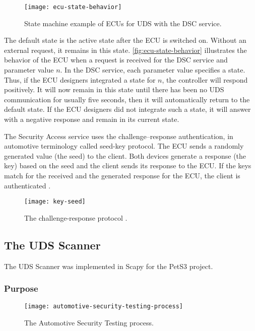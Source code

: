 \begin{figure}[h]
    \centering
    \texttt{[image: ecu-state-behavior]}
    \caption{State machine example of ECUs for UDS with the DSC service.}
    \label{fig:ecu-state-behavior}
\end{figure}

The default state is the active state after the ECU is switched on. Without an external request, it remains in this state. \autoref{fig:ecu-state-behavior} illustrates the behavior of the ECU when a request is received for the DSC service and parameter value $n$. In the DSC service, each parameter value specifies a state. Thus, if the ECU designers integrated a state for $n$, the controller will respond positively. It will now remain in this state until there has been no UDS communication for usually five seconds, then it will automatically return to the default state. If the ECU designers did not integrate such a state, it will answer with a negative response and remain in its current state.

The Security Access service uses the challenge–response authentication, in automotive terminology called seed-key protocol. The ECU sends a randomly generated value (the seed) to the client. Both devices generate a response (the key) based on the seed and the client sends its response to the ECU. If the keys match for the received and the generated response for the ECU, the client is authenticated \cite{iso14229}.

\begin{figure}[h]
    \centering
    \texttt{[image: key-seed]}
    \caption{The challenge-response protocol \cite{Herrewegen2018}.}
    \label{fig:key-seed}
\end{figure}


\subsection{The UDS Scanner}

The UDS Scanner was implemented in Scapy for the PetS3 project.

\subsubsection{Purpose}

\begin{figure}[h]
    \centering
    \texttt{[image: automotive-security-testing-process]}
    \caption{The Automotive Security Testing process.}
    \label{fig:automotive-security-testing-process}
\end{figure}

